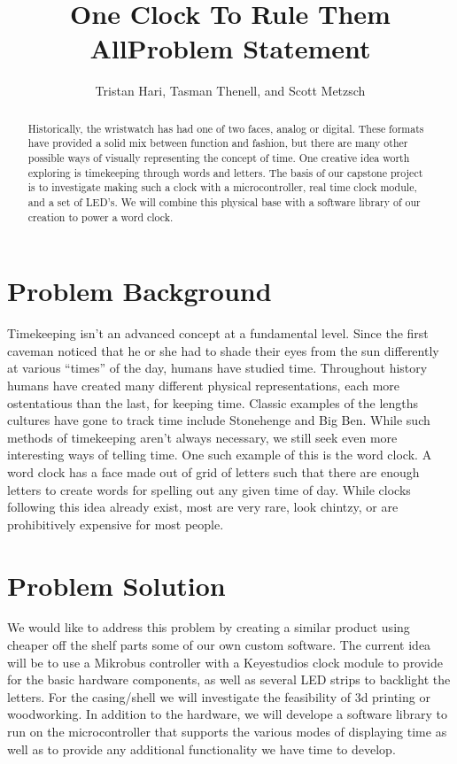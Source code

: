 \documentclass[10pt,draftclsnofoot,onecolumn]{IEEEtran}
\begin{document}
\title{One Clock To Rule Them All}
\author{Tristan Hari, Tasman Thenell, and Scott Metzsch}
\maketitle
\begin{abstract}
Historically, the wristwatch has had one of two faces, analog or digital. These
formats have provided a solid mix between function and fashion, but there are
many other possible ways of visually representing the concept of time. One
creative idea worth exploring is timekeeping through words and letters. The
basis of our capstone project is to investigate making such a clock with a
microcontroller, real time clock module, and a set of LED’s. We will combine
this physical base with a software library of our creation to power a word clock.
\end{abstract}
\IEEEpeerreviewmaketitle

\newpage
{}

\title{Problem Statement}
\section{Problem Background}
Timekeeping isn’t an advanced concept at a fundamental level. Since the first
caveman noticed that he or she had to shade their eyes from the sun differently
at various “times” of the day, humans have studied time. Throughout history
humans have created many different physical representations, each more
ostentatious than the last, for keeping time. Classic examples of the lengths
cultures have gone to track time include Stonehenge and Big Ben. While such
methods of timekeeping aren’t always necessary, we still seek even more
interesting ways of telling time. One such example of this is the word clock. A
word clock has a face made out of grid of letters such that there are enough
letters to create words for spelling out any given time of day. While clocks
following this idea already exist, most are very rare, look chintzy, or are
prohibitively expensive for most people.

\section{Problem Solution}
We would like to address this problem by creating a similar product using
cheaper off the shelf parts some of our own custom software. The current idea
will be to use a Mikrobus controller with a Keyestudios clock module to provide
for the basic hardware components, as well as several LED strips to backlight
the letters. For the casing/shell we will investigate the feasibility of 3d
printing or woodworking. In addition to the hardware, we will develope a
software library to run on the microcontroller that supports the various modes
of displaying time as well as to provide any additional functionality we have
time to develop.
\end{document}
